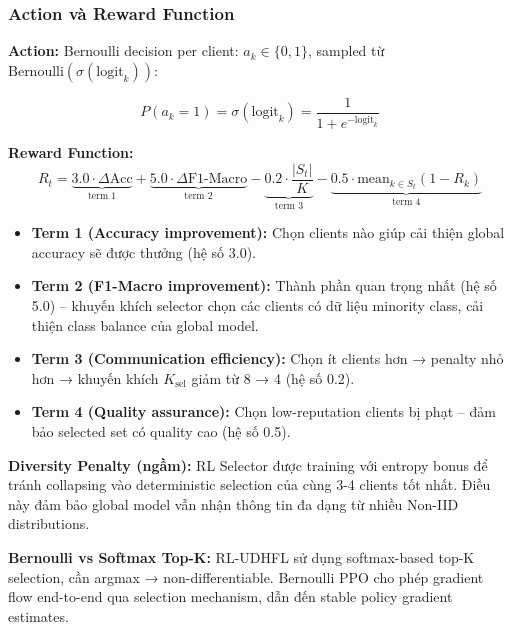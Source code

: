 \documentclass[12pt,a4paper]{article}
\begin{document}
\subsubsection{Action và Reward Function}

\textbf{Action:} Bernoulli decision per client: $a_k \in \{0, 1\}$, sampled từ $\text{Bernoulli}(\sigma(\text{logit}_k))$:

\begin{equation}
    P(a_k = 1) = \sigma(\text{logit}_k) = \frac{1}{1 + e^{-\text{logit}_k}} \label{eq:bernoulli_prob}
\end{equation}

\textbf{Reward Function:}
\begin{equation}
    R_t = \underbrace{3.0 \cdot \Delta\text{Acc}}_{\text{term 1}} + \underbrace{5.0 \cdot \Delta\text{F1-Macro}}_{\text{term 2}} - \underbrace{0.2 \cdot \frac{|S_t|}{K}}_{\text{term 3}} - \underbrace{0.5 \cdot \text{mean}_{k \in S_t}(1 - R_k)}_{\text{term 4}} \label{eq:selector_reward}
\end{equation}

\begin{itemize}
    \item \textbf{Term 1 (Accuracy improvement):} Chọn clients nào giúp cải thiện global accuracy sẽ được thưởng (hệ số 3.0).
    \item \textbf{Term 2 (F1-Macro improvement):} Thành phần quan trọng nhất (hệ số 5.0) -- khuyến khích selector chọn các clients có dữ liệu minority class, cải thiện class balance của global model.
    \item \textbf{Term 3 (Communication efficiency):} Chọn ít clients hơn → penalty nhỏ hơn → khuyến khích $K_{\text{sel}}$ giảm từ 8 → 4 (hệ số 0.2).
    \item \textbf{Term 4 (Quality assurance):} Chọn low-reputation clients bị phạt -- đảm bảo selected set có quality cao (hệ số 0.5).
\end{itemize}

\textbf{Diversity Penalty (ngầm):} RL Selector được training với entropy bonus để tránh collapsing vào deterministic selection của cùng 3-4 clients tốt nhất. Điều này đảm bảo global model vẫn nhận thông tin đa dạng từ nhiều Non-IID distributions.

\textbf{Bernoulli vs Softmax Top-K:} RL-UDHFL sử dụng softmax-based top-K selection, cần argmax → non-differentiable. Bernoulli PPO cho phép gradient flow end-to-end qua selection mechanism, dẫn đến stable policy gradient estimates.
\end{document}
